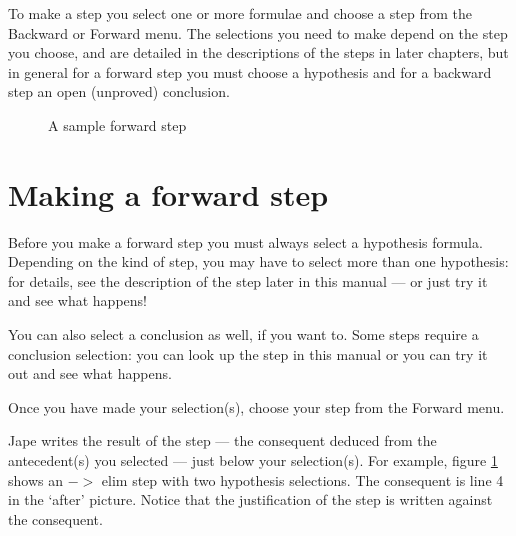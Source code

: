 \documentclass[11pt]{book}
\newcommand{\figref}[1]{figure \ref{fig:#1}}
\begin{document}
To make a step you select one or more formulae and choose a step from the Backward or Forward menu. The selections you need to make depend on the step you choose, and are detailed in the descriptions of the steps in later chapters, but in general for a forward step you must choose a hypothesis and for a backward step an open (unproved) conclusion.

\begin{figure}
\centering
{}
\qquad
{}
\caption{A sample forward step}
\label{fig:two-selectionforwardstep}
\end{figure}
\section{Making a forward step}

Before you make a forward step you must always select a hypothesis formula. Depending on the kind of step, you may have to select more than one hypothesis: for details, see the description of the step later in this manual --- or just try it and see what happens!

You can also select a conclusion as well, if you want to. Some steps require a conclusion selection: you can look up the step in this manual or you can try it out and see what happens. 

Once you have made your selection(s), choose your step from the Forward menu.

Jape writes the result of the step --- the consequent deduced from the antecedent(s) you selected --- just below your selection(s). For example, \figref{two-selectionforwardstep} shows an $->$ elim step with two hypothesis selections. The consequent is line 4 in the `after' picture. Notice that the justification of the step is written against the consequent.
\end{document}
